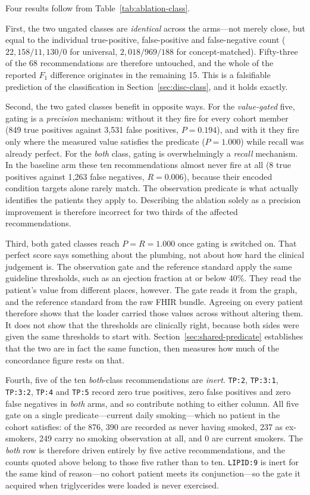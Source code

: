 Four results follow from Table~\ref{tab:ablation-class}.

First, the two ungated classes are \emph{identical} across the arms---not merely close, but
equal to the individual true-positive, false-positive and false-negative count
($22{,}158/11{,}130/0$ for universal, $2{,}018/969/188$ for concept-matched). Fifty-three of
the 68 recommendations are therefore untouched, and the whole of the reported $F_1$
difference originates in the remaining 15. This is a falsifiable prediction of the
classification in Section~\ref{sec:disc-class}, and it holds exactly.

Second, the two gated classes benefit in opposite ways. For the \emph{value-gated} five, gating is a \emph{precision} mechanism: without it they
fire for every cohort member (849 true positives against 3{,}531 false positives,
$P = 0.194$), and with it they fire only where the measured value satisfies the predicate
($P = 1.000$) while recall was already perfect. For the \emph{both} class, gating is overwhelmingly a \emph{recall} mechanism. In the
baseline arm these ten recommendations almost never fire at all (8 true positives against
1{,}263 false negatives, $R = 0.006$), because their encoded condition targets alone rarely
match. The observation predicate is what actually identifies the patients they apply to. Describing the ablation solely as a
precision improvement is therefore incorrect for two thirds of the affected
recommendations.

Third, both gated classes reach $P = R = 1.000$ once gating is switched on. That
perfect score says something about the plumbing, not about how hard the clinical judgement is.
The observation gate and the reference standard apply the same guideline thresholds, such as
an ejection fraction at or below 40\%. They read the patient's value from different places,
however. The gate reads it from the graph, and the reference standard from the raw FHIR
bundle. Agreeing on every patient therefore shows that the loader carried those values across
without altering them. It does not show that the thresholds are clinically right, because both
sides were given the same thresholds to start with. Section~\ref{sec:shared-predicate}
establishes that the two are in fact the same function, then measures how much of the
concordance figure rests on that.

Fourth, five of the ten \emph{both}-class recommendations are \emph{inert}. \texttt{TP:2},
\texttt{TP:3:1}, \texttt{TP:3:2}, \texttt{TP:4} and \texttt{TP:5} record zero true positives,
zero false positives and zero false negatives in \emph{both} arms, and so contribute nothing to
either column. All five gate on a single predicate---current daily smoking---which no patient in
the cohort satisfies: of the 876, 390 are recorded as never having
smoked, 237 as ex-smokers, 249 carry no smoking observation at all,
and 0 are current smokers. The \emph{both} row is therefore driven entirely by five
active recommendations, and the counts quoted above belong to those five rather than to ten.
\texttt{LIPID:9} is inert for the same kind of reason---no cohort patient meets its
conjunction---so the gate it acquired when triglycerides were loaded is never exercised.

